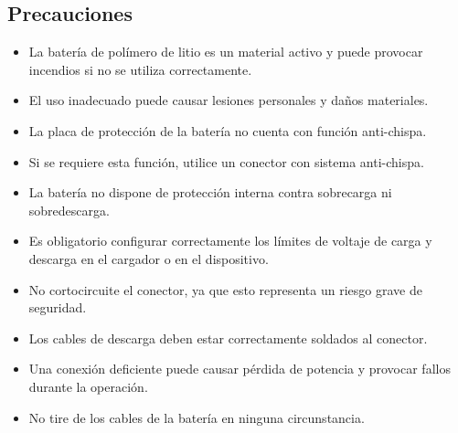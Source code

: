 \documentclass[a4paper,12pt,oneside,pdflatex,italian,final,twocolumn]{article}
\begin{document}
\subsection{Precauciones}
\begin{itemize}
    \item La batería de polímero de litio es un material activo y puede provocar incendios si no se utiliza correctamente.
    \item El uso inadecuado puede causar lesiones personales y daños materiales.
    \item La placa de protección de la batería no cuenta con función anti-chispa.
    \item Si se requiere esta función, utilice un conector con sistema anti-chispa.
    \item La batería no dispone de protección interna contra sobrecarga ni sobredescarga.
    \item Es obligatorio configurar correctamente los límites de voltaje de carga y descarga en el cargador o en el dispositivo.
    \item No cortocircuite el conector, ya que esto representa un riesgo grave de seguridad.
    \item Los cables de descarga deben estar correctamente soldados al conector.
    \item Una conexión deficiente puede causar pérdida de potencia y provocar fallos durante la operación.
    \item No tire de los cables de la batería en ninguna circunstancia.
\end{itemize}
\end{document}
